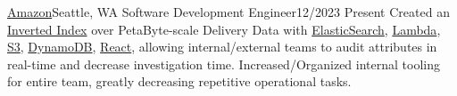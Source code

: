 \resumeSubheading
{\href{https://www.amazon.jobs/en/teams/last-mile}{Amazon}}{Seattle, WA}
{Software Development Engineer}{12/2023 \textemdash Present}
\resumeItemListStart
{}
{Created an \href{https://en.wikipedia.org/wiki/Inverted_index}{Inverted Index} over PetaByte-scale Delivery Data with \href{https://aws.amazon.com/opensearch-service/}{ElasticSearch}, \href{https://aws.amazon.com/lambda/}{Lambda}, \href{https://aws.amazon.com/s3/}{S3}, \href{https://aws.amazon.com/dynamodb/}{DynamoDB}, \href{https://react.dev/}{React}, allowing internal/external teams to audit attributes in real-time and decrease investigation time.}
{Increased/Organized internal tooling for entire team, greatly decreasing repetitive operational tasks.}
\resumeItemListEnd
